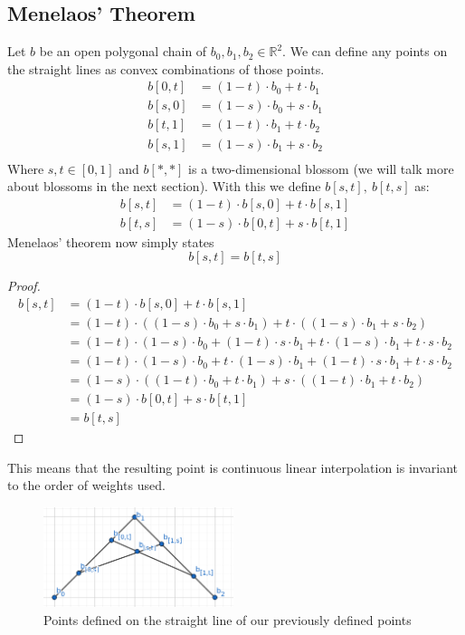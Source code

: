 \subsection{Menelaos' Theorem}
\begin{theorem}\label{Men}
Let $b$ be an open polygonal chain of $b_0, b_1, b_2 \in \mathbb{R}^2$.  We can define any points on the straight lines as convex combinations of those points.
\begin{align*}
    b[0,t] &= (1-t) \cdot b_0 + t \cdot b_1\\
    b[s,0] &= (1-s) \cdot b_0 + s \cdot b_1\\
    b[t,1] &= (1-t) \cdot b_1 + t \cdot b_2\\
    b[s,1] &= (1-s) \cdot b_1 + s \cdot b_2\\
\end{align*}
Where $s,t \in [0,1]$ and $b[*, *]$ is a two-dimensional blossom (we will talk more about blossoms in the next section). With this we define $b[s,t], ~ b[t,s]$ as:
\begin{align*}
    b[s,t] &= (1-t) \cdot b[s,0] + t \cdot b[s,1]\\
    b[t,s] &= (1-s) \cdot b[0,t] + s \cdot b[t,1]
\end{align*}
Menelaos' theorem now simply states
\[
    b[s,t] = b[t,s]
\]
\end{theorem}
\begin{proof}
\begin{align*}
    b[s,t] &= (1-t) \cdot b[s,0] + t \cdot b[s,1]\\
    &= (1-t) \cdot ( (1-s) \cdot b_0 + s \cdot b_1 ) + t \cdot ( (1-s) \cdot b_1 + s \cdot b_2 ) \\
    &= (1-t) \cdot (1-s) \cdot b_0 + (1-t) \cdot s \cdot b_1 + t\cdot (1-s) \cdot b_1 + t \cdot s \cdot b_2\\
    &= (1-t) \cdot (1-s) \cdot b_0 + t\cdot (1-s) \cdot b_1 +  (1-t) \cdot s \cdot b_1 +t \cdot s \cdot b_2\\
    &= (1-s) \cdot ( (1-t) \cdot b_0 + t \cdot b_1 ) + s \cdot ( (1-t) \cdot b_1 + t \cdot b_2 )\\
    &= (1-s) \cdot b[0,t] + s \cdot b[t,1]\\
    &= b[t,s]
\end{align*}
\end{proof}
This means that the resulting point is continuous linear interpolation is invariant to the order of weights used.
\begin{figure}[H]
    \centering
    \includegraphics[width=15em]{Menelaos3.png}
    \caption{Points defined on the straight line of our previously defined points}
    \label{fig:Men}
\end{figure}
